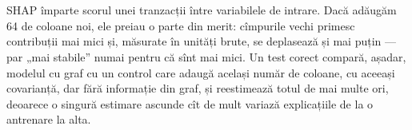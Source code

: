 \section{}
\begin{intuition}
%
{SHAP împarte scorul unei tranzacții între variabilele de intrare. Dacă adăugăm 64 de coloane noi, ele preiau o parte din merit: cîmpurile vechi primesc contribuții mai mici și, măsurate în unități brute, se deplasează și mai puțin --- par „mai stabile” numai pentru că sînt mai mici.
Un test corect compară, așadar, modelul cu graf cu un control care adaugă același număr de coloane, cu aceeași covarianță, dar fără informație din graf, și reestimează totul de mai multe ori, deoarece o singură estimare ascunde cît de mult variază explicațiile de la o antrenare la alta.}
\end{intuition}
